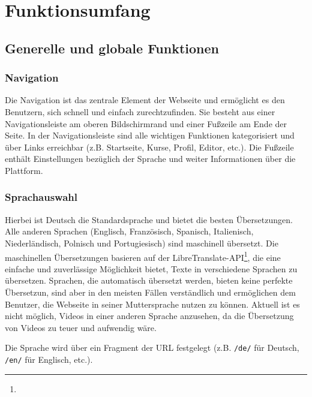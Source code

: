 \documentclass{subfiles}
\begin{document}
\section{Funktionsumfang}\label{sec:website-features}

\subsection{Generelle und globale Funktionen}

\subsubsection{Navigation}
Die Navigation ist das zentrale Element der Webseite und ermöglicht es den Benutzern, sich schnell und einfach zurechtzufinden.
Sie besteht aus einer Navigationsleiste am oberen Bildschirmrand und einer Fußzeile am Ende der Seite.
In der Navigationsleiste sind alle wichtigen Funktionen kategorisiert und über Links erreichbar (z.B. Startseite, Kurse, Profil, Editor, etc.).
Die Fußzeile enthält Einstellungen bezüglich der Sprache und weiter Informationen über die Plattform.

\subsubsection{Sprachauswahl}
Hierbei ist Deutsch die Standardsprache und bietet die besten Übersetzungen.
Alle anderen Sprachen (Englisch, Französisch, Spanisch, Italienisch, Niederländisch, Polnisch und Portugiesisch) sind maschinell übersetzt.
Die maschinellen Übersetzungen basieren auf der LibreTranslate-API\footnote{}, die eine einfache und zuverlässige Möglichkeit bietet, Texte in verschiedene Sprachen zu übersetzen.
Sprachen, die automatisch übersetzt werden, bieten keine perfekte Übersetzun, sind aber in den meisten Fällen verständlich und ermöglichen dem Benutzer, die Webseite in seiner Muttersprache nutzen zu können.
Aktuell ist es nicht möglich, Videos in einer anderen Sprache anzusehen, da die Übersetzung von Videos zu teuer und aufwendig wäre.

Die Sprache wird über ein Fragment der URL festgelegt (z.B. \texttt{\dq /de/\dq} für Deutsch, \texttt{\dq /en/\dq} für Englisch, etc.).
\end{document}
